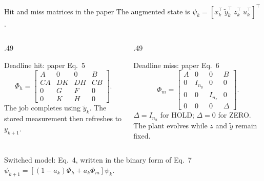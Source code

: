 \documentclass[8pt,aspectratio=169]{beamer}
\gdef\CPSOrigin{PAPER}%
\gdef\CPSSourceContext{}%
\newcommand{\src}[1][]{\gdef\CPSSourceContext{#1}}%
\begin{document}
\begin{frame}{Hit and miss matrices in the paper}
\gdef\CPSSourceContext{}
\gdef\CPSOrigin{PAPER}
\small
The augmented state is $\psi_k=[x_k^\top\ \tilde y_k^\top\ z_k^\top\ u_k^\top]^\top$.
\begin{columns}[T,onlytextwidth]
\begin{column}{.49\textwidth}
\begin{block}{Deadline hit: paper Eq.~5}
\[
\Phi_h=\begin{bmatrix}
A&0&0&B\\
CA&DK&DH&CB\\
0&G&F&0\\
0&K&H&0
\end{bmatrix}.
\]
The job completes using $\tilde y_k$. The stored measurement then refreshes to $y_{k+1}$.
\end{block}
\end{column}
\begin{column}{.49\textwidth}
\begin{block}{Deadline miss: paper Eq.~6}
\[
\Phi_m=\begin{bmatrix}
A&0&0&B\\
0&I_{n_y}&0&0\\
0&0&I_{n_z}&0\\
0&0&0&\Delta
\end{bmatrix}.
\]
$\Delta=I_{n_u}$ for HOLD; $\Delta=0$ for ZERO. The plant evolves while $z$ and $\tilde y$ remain fixed.
\end{block}
\end{column}
\end{columns}
\begin{block}{Switched model: Eq.~4, written in the binary form of Eq.~7}
\centering $\psi_{k+1}=[(1-a_k)\Phi_h+a_k\Phi_m]\psi_k$.
\end{block}
\src[Eqs.~3--7]
\end{frame}
\end{document}
